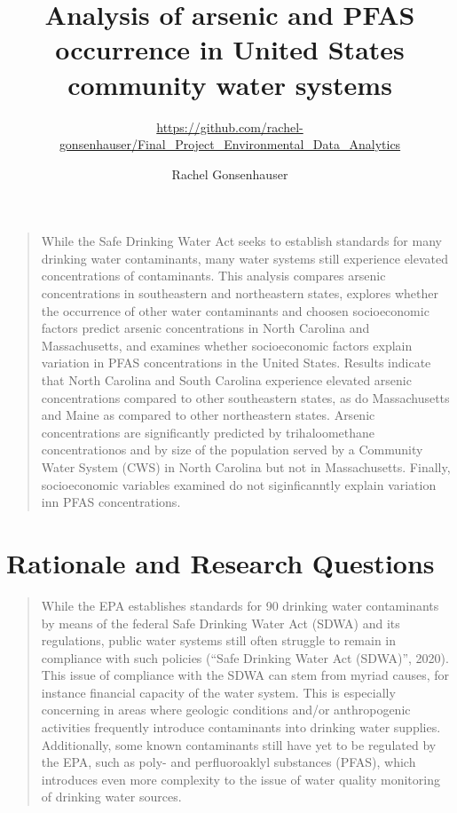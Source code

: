 \documentclass[12pt,]{article}
\title{Analysis of arsenic and PFAS occurrence in United States community water
systems}
\subtitle{\url{https://github.com/rachel-gonsenhauser/Final_Project_Environmental_Data_Analytics}}
\author{Rachel Gonsenhauser}
\date{}
\begin{document}
\maketitle

\newpage
\abstract

\begin{quote}
While the Safe Drinking Water Act seeks to establish standards for many
drinking water contaminants, many water systems still experience
elevated concentrations of contaminants. This analysis compares arsenic
concentrations in southeastern and northeastern states, explores whether
the occurrence of other water contaminants and choosen socioeconomic
factors predict arsenic concentrations in North Carolina and
Massachusetts, and examines whether socioeconomic factors explain
variation in PFAS concentrations in the United States. Results indicate
that North Carolina and South Carolina experience elevated arsenic
concentrations compared to other southeastern states, as do
Massachusetts and Maine as compared to other northeastern states.
Arsenic concentrations are significantly predicted by trihaloomethane
concentrationos and by size of the population served by a Community
Water System (CWS) in North Carolina but not in Massachusetts. Finally,
socioeconomic variables examined do not siginficanntly explain variation
inn PFAS concentrations.
\end{quote}

\newpage
\tableofcontents 
\newpage
\listoftables 
\newpage
\listoffigures 
\newpage

\hypertarget{rationale-and-research-questions}{%
\section{Rationale and Research
Questions}\label{rationale-and-research-questions}}

\begin{quote}
While the EPA establishes standards for 90 drinking water contaminants
by means of the federal Safe Drinking Water Act (SDWA) and its
regulations, public water systems still often struggle to remain in
compliance with such policies (``Safe Drinking Water Act (SDWA)'',
2020). This issue of compliance with the SDWA can stem from myriad
causes, for instance financial capacity of the water system. This is
especially concerning in areas where geologic conditions and/or
anthropogenic activities frequently introduce contaminants into drinking
water supplies. Additionally, some known contaminants still have yet to
be regulated by the EPA, such as poly- and perfluoroaklyl substances
(PFAS), which introduces even more complexity to the issue of water
quality monitoring of drinking water sources.
\end{quote}
\end{document}
